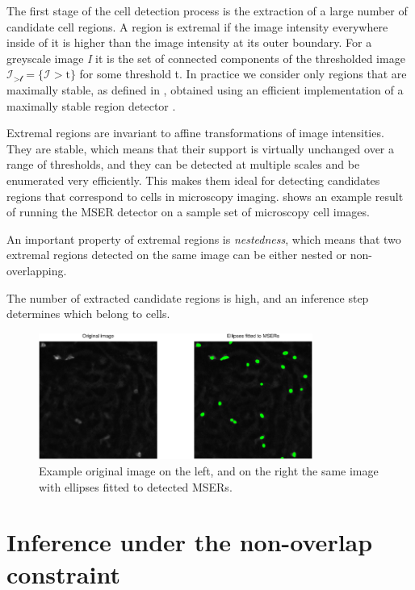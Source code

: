 	The first stage of the cell detection process is the extraction of a large number of candidate cell regions. A region is extremal if the image intensity everywhere inside of it is higher than the image intensity at its outer boundary. For a greyscale image \textit{I} it is the set of connected components of the thresholded image $\mathcal{I_{>\text{t}}} = \{\mathcal{I} > \text{t}\}$ for some threshold t. In practice we consider only regions that are maximally stable, as defined in \cite{matas02}, obtained using an efficient implementation of a maximally stable region detector \cite{vedaldi08vlfeat}.
	
	Extremal regions are invariant to affine transformations of image intensities. They are stable, which means that their support is virtually unchanged over a range of thresholds, and they can be detected at multiple scales and be enumerated very efficiently. This makes them ideal for detecting candidates regions that correspond to cells in microscopy imaging.  shows an example result of running the MSER detector on a sample set of microscopy cell images.
	
	An important property of extremal regions is \textit{nestedness}, which means that two extremal regions detected on the same image can be either nested or non-overlapping.
	
	The number of extracted candidate regions is high, and an inference step determines which belong to cells.
	
	\begin{figure}[h]
		\centering
		\includegraphics[width=0.8\textwidth]{images/fig_detector_mser}
		\caption{Example original image on the left, and on the right the same image with ellipses fitted to detected MSERs.}
		\label{fig:detector_mser}
	\end{figure}
	
	\section{Inference under the non-overlap constraint}
	\label{sec:detector_inference}
	
